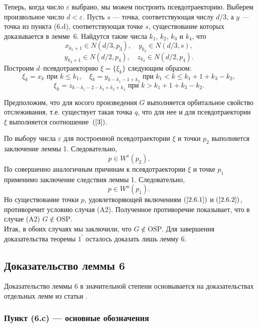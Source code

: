 \documentclass[12pt]{article}
\begin{document}
Теперь, когда число $\varepsilon$ выбрано, мы можем построить псевдотраекторию. Выберем произвольное число $d<\varepsilon$. Пусть $s$ --- точка, соответствующая числу $d/3$, а $y$ --- точка из пункта (6.d), соответствующая точке $s$, существование которых доказывается в лемме~6. Найдутся такие числа $k_1$, $k_2$, $k_3$ и $k_4$, что
$$x_{k_1+1}\in N(d/3,p_3),\quad y_{k_2}\in N(d/3,s),$$
$$y_{k_3+1}\in N(d/2,p_4),\quad z_{k_4}\in N(d/2,p_4).$$
Построим $d$--псевдотраекторию $\xi=\{\xi_k\}$ следующим образом: 
$$\xi_k=x_k\textrm{ при }k\leq k_1,\quad\xi_{k}=y_{k-k_1-1+k_2}\textrm{ при }k_1<k\leq k_1+1+k_3-k_2,$$
$$\xi_k=z_{k-k_1-2-k_3+k_2+k_4}\textrm{ при }k>k_1+1+k_3-k_2.$$

Предположим, что для косого произведения $G$ выполняется орбитальное свойство отслеживания, т.е. существует такая точка $q$, что для нее и для псевдотраектории $\xi$ выполняется соотношение~$(\ref{3})$.

По выбору числа $\varepsilon$ для построенной псевдотраектории $\xi$ и точки $p_2$ выполняется заключение леммы 1.
Следовательно,
\begin{equation}
\label{2.6.1}
p\in W^s(p_2).
\end{equation}
По совершенно аналогичным причинам к псевдотраектории $\xi$ и точке $p_1$ применимо заключение следствия леммы 1. Следовательно,
\begin{equation}
\label{2.6.2}
p\in W^u(p_1).
\end{equation}
Но существование точки $p$, удовлетворяющей включениям $(\ref{2.6.1})$ и $(\ref{2.6.2})$, противоречит условию случая (A2). Полученное противоречие показывает, что в случае (A2) $G\notin\textrm{OSP}$.
\\

Итак, в обоих случаях мы заключили, что $G\notin\textrm{OSP}$. Для завершения доказательства теоремы $\textrm{1}^{\prime}$ осталось доказать лишь лемму 6.

\subsection{Доказательство леммы 6}
Доказательство леммы 6 в значительной степени основывается на доказательствах отдельных лемм из статьи \cite{17}. %

\subsubsection{Пункт (6.c) --- основные обозначения}
\end{document}

